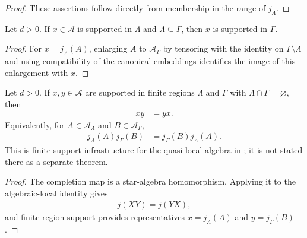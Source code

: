 \begin{proof}\leanok
    These assertions follow directly from membership in the range of
    $j_\Lambda$.
\end{proof}

\begin{lemma}
    \label{lem:qca_quasi_local_support_mono}
    \leanok
    Let $d>0$.  If $x\in\mathcal A$ is supported in $\Lambda$ and
    $\Lambda\subseteq\Gamma$, then $x$ is supported in $\Gamma$.
\end{lemma}

\begin{proof}\leanok
    For $x=j_\Lambda(A)$, enlarging $A$ to $\mathcal A_\Gamma$ by tensoring
    with the identity on $\Gamma\setminus\Lambda$ and using compatibility of the
    canonical embeddings identifies the image of this enlargement with $x$.
\end{proof}

\begin{lemma}
    \label{thm:qca_disjoint_quasi_local_commute}
    \leanok
    Let $d>0$.  If $x,y\in\mathcal A$ are supported in finite regions
    $\Lambda$ and $\Gamma$ with $\Lambda\cap\Gamma=\varnothing$, then
    \begin{align}
        xy & =yx.
    \end{align}
    Equivalently, for $A\in\mathcal A_\Lambda$ and
    $B\in\mathcal A_\Gamma$,
    \begin{align}
        j_\Lambda(A)j_\Gamma(B) & =j_\Gamma(B)j_\Lambda(A).
    \end{align}
    This is finite-support infrastructure for the quasi-local algebra in
    \cite[lines~2292--2300]{Cirac2017MPU}; it is not stated there as a separate
    theorem.
\end{lemma}

\begin{proof}\leanok
    The completion map is a star-algebra homomorphism.  Applying it to the
    algebraic-local identity gives
    \begin{align}
        j(XY)=j(YX),
    \end{align}
    and finite-region support provides representatives
    $x=j_\Lambda(A)$ and $y=j_\Gamma(B)$.
\end{proof}


